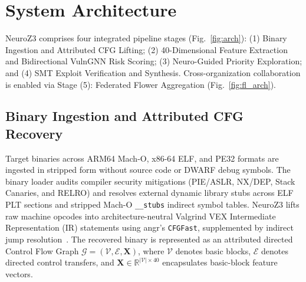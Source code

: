 \documentclass[10pt,conference]{IEEEtran}
\begin{document}
\section{System Architecture}
\label{sec:arch}

NeuroZ3 comprises four integrated pipeline stages (Fig.~\ref{fig:arch}): (1) Binary Ingestion and Attributed CFG Lifting;
(2) 40-Dimensional Feature Extraction and Bidirectional VulnGNN Risk Scoring; (3) Neuro-Guided Priority Exploration; and
(4) SMT Exploit Verification and Synthesis. Cross-organization collaboration is enabled via Stage (5): Federated Flower
Aggregation (Fig.~\ref{fig:fl_arch}).

\subsection{Binary Ingestion and Attributed CFG Recovery}
Target binaries across ARM64 Mach-O, x86-64 ELF, and PE32 formats are ingested in stripped form without source code or DWARF
debug symbols. The binary loader audits compiler security mitigations (PIE/ASLR, NX/DEP, Stack Canaries, and RELRO) and resolves
external dynamic library stubs across ELF PLT sections and stripped Mach-O \texttt{\_\_stubs} indirect symbol tables. NeuroZ3 lifts
raw machine opcodes into architecture-neutral Valgrind VEX Intermediate Representation (IR) statements using angr's \texttt{CFGFast},
supplemented by indirect jump resolution~\cite{bailey2025survey}. The recovered binary is represented as an attributed directed Control
Flow Graph $\mathcal{G} = (\mathcal{V}, \mathcal{E}, \mathbf{X})$, where $\mathcal{V}$ denotes basic blocks, $\mathcal{E}$ denotes
directed control transfers, and $\mathbf{X} \in \mathbb{R}^{|\mathcal{V}| \times 40}$ encapsulates basic-block feature vectors.
\end{document}
